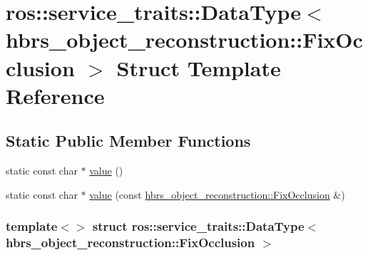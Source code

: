 \hypertarget{structros_1_1service__traits_1_1_data_type_3_01hbrs__object__reconstruction_1_1_fix_occlusion_01_4}{\section{ros\-:\-:service\-\_\-traits\-:\-:\-Data\-Type$<$ hbrs\-\_\-object\-\_\-reconstruction\-:\-:\-Fix\-Occlusion $>$ \-Struct \-Template \-Reference}
\label{structros_1_1service__traits_1_1_data_type_3_01hbrs__object__reconstruction_1_1_fix_occlusion_01_4}
}
\subsection*{\-Static \-Public \-Member \-Functions}
\begin{DoxyCompactItemize}
\item 
static const char $\ast$ \hyperlink{structros_1_1service__traits_1_1_data_type_3_01hbrs__object__reconstruction_1_1_fix_occlusion_01_4_ac16c95d1ee09dd0225e3ebe463840b66}{value} ()
\item 
static const char $\ast$ \hyperlink{structros_1_1service__traits_1_1_data_type_3_01hbrs__object__reconstruction_1_1_fix_occlusion_01_4_a95072701d2c2f2dd8770c6ff2d7892a0}{value} (const \hyperlink{structhbrs__object__reconstruction_1_1_fix_occlusion}{hbrs\-\_\-object\-\_\-reconstruction\-::\-Fix\-Occlusion} \&)
\end{DoxyCompactItemize}
\subsubsection*{template$<$$>$ struct ros\-::service\-\_\-traits\-::\-Data\-Type$<$ hbrs\-\_\-object\-\_\-reconstruction\-::\-Fix\-Occlusion $>$}



